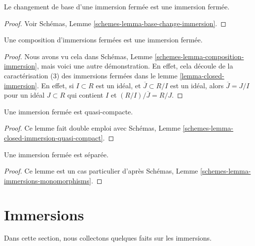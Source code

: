 \begin{lemma}
\label{lemma-base-change-closed-immersion}
Le changement de base d'une immersion fermée est une immersion fermée.
\end{lemma}

\begin{proof}
Voir Schémas, Lemme \ref{schemes-lemma-base-change-immersion}.
\end{proof}

\begin{lemma}
\label{lemma-composition-closed-immersion}
Une composition d'immersions fermées est une immersion fermée.
\end{lemma}

\begin{proof}
Nous avons vu cela
dans Schémas, Lemme \ref{schemes-lemma-composition-immersion}, mais voici une
autre démonstration.
En effet, cela découle de la caractérisation (3) des immersions
fermées dans le lemme \ref{lemma-closed-immersion}. En effet, si
$I \subset R$ est un idéal, et $\overline{J} \subset R/I$ est un idéal,
alors $\overline{J} = J/I$ pour un idéal $J \subset R$ qui contient
$I$ et $(R/I)/\overline{J} = R/J$.
\end{proof}

\begin{lemma}
\label{lemma-closed-immersion-quasi-compact}
Une immersion fermée est quasi-compacte.
\end{lemma}

\begin{proof}
Ce lemme fait double
emploi avec Schémas, Lemme \ref{schemes-lemma-closed-immersion-quasi-compact}.
\end{proof}

\begin{lemma}
\label{lemma-closed-immersion-separated}
Une immersion fermée est séparée.
\end{lemma}

\begin{proof}
Ce lemme est un cas particulier
d'après Schémas, Lemme \ref{schemes-lemma-immersions-monomorphisms}.
\end{proof}





\section{Immersions}
\label{section-immersions}

\noindent
Dans cette section, nous collectons quelques faits sur les immersions.

